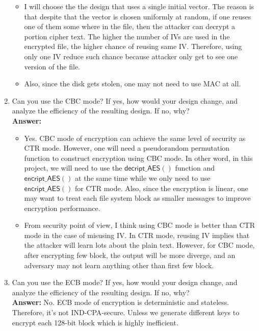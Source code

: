 \documentclass[a4paper,10pt]{article}
\begin{document}
\begin{enumerate}
  \begin{itemize}
    \item 
    I will choose the the design that uses a single initial vector. The reason is that despite that the vector is chosen uniformly at random, if one reuses one of them some where in the file, then the attacker can decrypt a portion cipher text. The higher the number of IVs are used in the encrypted file, the higher chance of reusing same IV. Therefore, using only one IV reduce such chance because attacker only get to see one version of the file.
    \item Also, since the disk gets stolen, one may not need to use MAC at all.
  \end{itemize}
  \item Can you use the CBC mode? If yes, how would your design change, and analyze the efficiency of the resulting design. If no, why?
  \\
  \textbf{Answer:} 
  \begin{itemize}
    \item 
    Yes. CBC mode of encryption can achieve the same level of security as CTR mode. However, one will need a pseudorandom permutation function to construct encryption using CBC mode. In other word, in this project, we will need to use the $\mathsf{decript\_AES()}$ function and $\mathsf{encript\_AES()}$ at the same time while we only need to use $\mathsf{encript\_AES()}$ for CTR mode. Also, since the encryption is linear, one may want to treat each file system block as smaller messages to improve encryption performance.  
    \item From security point of view,  I think using CBC mode is better than CTR mode in the case of misusing IV. In CTR mode, reusing IV implies that the attacker will learn lots about the plain text. However, for CBC mode, after encrypting few block, the output will be more diverge, and an adversary may not learn anything other than first few block.
  \end{itemize}

  
  \item Can you use the ECB mode? If yes, how would your design change, and analyze the efficiency of the resulting design. If no, why?
  \\
  \textbf{Answer:} No. ECB mode of encryption is deterministic and stateless. Therefore, it's not IND-CPA-secure. Unless we generate different keys to encrypt each 128-bit block which is highly inefficient. 
\end{enumerate}
\end{document}
